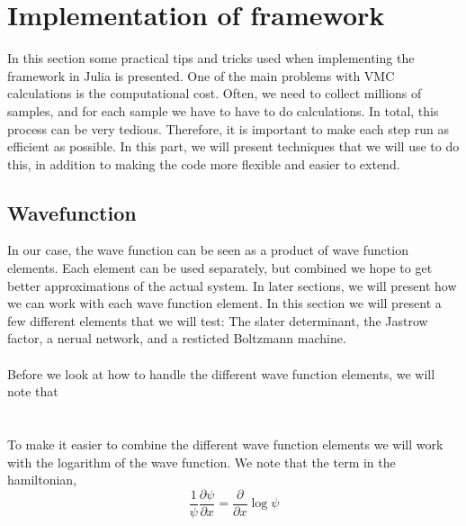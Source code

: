 \newpage

\section{Implementation of framework}
In this section some practical tips and tricks used when implementing the framework in Julia is presented. One of the main problems with VMC calculations is the computational cost. Often, we need to collect millions of samples, and for each sample we have to have to do calculations. In total, this process can be very tedious. Therefore, it is important to make each step run as efficient as possible. In this part, we will present techniques that we will use to do this, in addition to making the code more flexible and easier to extend. 
\subsection{Wavefunction}
In our case, the wave function can be seen as a product of wave function elements. Each element can be used separately, but combined we hope to get better approximations of the actual system. In later sections, we will present how we can work with each wave function element. In this section we will present a few different elements that we will test: The slater determinant, the Jastrow factor, a nerual network, and a resticted Boltzmann machine. 
\\
\\
Before we look at how to handle the different wave function elements, we will note that 
\begin{equation}
    
\end{equation}
\\
\\
To make it easier to combine the different wave function elements we will work with the logarithm of the wave function. We note that the term in the hamiltonian, 
\begin{equation}
    \frac{1}{\psi}\frac{\partial \psi}{\partial x} = \frac{\partial}{\partial x}\log \psi
\end{equation}


